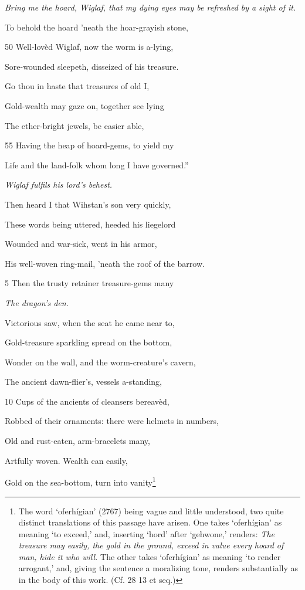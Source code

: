 \emph{Bring me the
hoard, Wiglaf, that
my dying eyes may
be refreshed by a
sight of it.}

To behold the hoard ’neath the hoar-grayish stone,

50
Well-lovèd Wiglaf, now the worm is a-lying,

Sore-wounded sleepeth, disseized of his treasure.

Go thou in haste that treasures of old I,

Gold-wealth may gaze on, together see lying

The ether-bright jewels, be easier able,

55
Having the heap of hoard-gems, to yield my

Life and the land-folk whom long I have governed.”



\emph{Wiglaf fulfils his
lord’s behest.}

Then heard I that Wihstan’s son very quickly,

These words being uttered, heeded his liegelord

Wounded and war-sick, went in his armor,

His well-woven ring-mail, ’neath the roof of the barrow.

5
Then the trusty retainer treasure-gems many

\emph{The dragon’s den.}

Victorious saw, when the seat he came near to,

Gold-treasure sparkling spread on the bottom,

Wonder on the wall, and the worm-creature’s cavern,

The ancient dawn-flier’s, vessels a-standing,

10
Cups of the ancients of cleansers bereavèd,

Robbed of their ornaments: there were helmets in numbers,

Old and rust-eaten, arm-bracelets many,

Artfully woven. Wealth can easily,

Gold on the sea-bottom, turn into vanity\footnote{The word ‘oferhígian’ (2767) being vague and little understood, two
quite distinct translations of this passage have arisen. One takes ‘oferhígian’
as meaning ‘to exceed,’ and, inserting ‘hord’ after ‘gehwone,’ renders: \emph{The
treasure may easily, the gold in the ground, exceed in value every hoard of
man, hide it who will.} The other takes ‘oferhígian’ as meaning ‘to render
arrogant,’ and, giving the sentence a moralizing tone, renders substantially as
in the body of this work. (Cf. 28 13 et seq.)}

